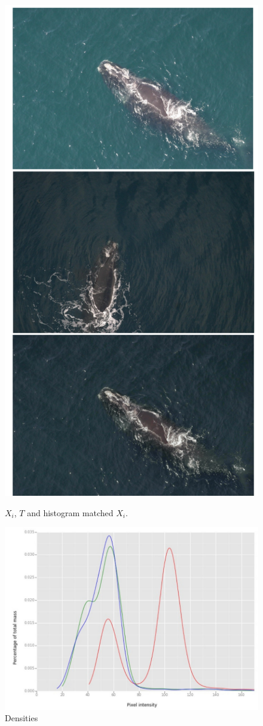 \documentclass{IET}%
\begin{document}
\begin{figure}
\centering
\begin{minipage}[t]{.5\textwidth}
\centering
\includegraphics[height=\textwidth]{images/histMatch/images1.png}
\caption{$X_i$, $T$ and histogram matched $X_i$.}
\end{minipage}\hfill
\begin{minipage}[t]{.5\textwidth}
\centering
\includegraphics[width=\textwidth]{images/histMatch/density.jpg}
\caption{Densities}
\end{minipage}
\end{figure}
\end{document}
